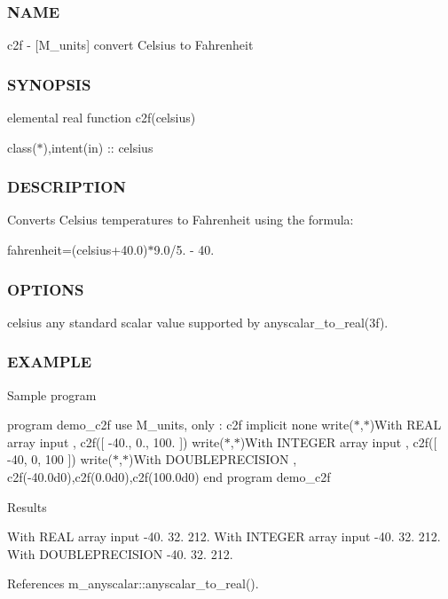 \subsubsection*{N\+A\+ME}

c2f -\/ \mbox{[}M\+\_\+units\mbox{]} convert Celsius to Fahrenheit \subsubsection*{S\+Y\+N\+O\+P\+S\+IS}

elemental real function c2f(celsius)

class($\ast$),intent(in) \+:\+: celsius \subsubsection*{D\+E\+S\+C\+R\+I\+P\+T\+I\+ON}

Converts Celsius temperatures to Fahrenheit using the formula\+:

fahrenheit=(celsius+40.0)$\ast$9.0/5. -\/ 40. \subsubsection*{O\+P\+T\+I\+O\+NS}

celsius any standard scalar value supported by anyscalar\+\_\+to\+\_\+real(3f). \subsubsection*{E\+X\+A\+M\+P\+LE}

Sample program

program demo\+\_\+c2f use M\+\_\+units, only \+: c2f implicit none write($\ast$,$\ast$)\textquotesingle{}With R\+E\+AL array input \textquotesingle{}, c2f(\mbox{[} -\/40., 0., 100. \mbox{]}) write($\ast$,$\ast$)\textquotesingle{}With I\+N\+T\+E\+G\+ER array input \textquotesingle{}, c2f(\mbox{[} -\/40, 0, 100 \mbox{]}) write($\ast$,$\ast$)\textquotesingle{}With D\+O\+U\+B\+L\+E\+P\+R\+E\+C\+I\+S\+I\+ON \textquotesingle{}, c2f(-\/40.\+0d0),c2f(0.\+0d0),c2f(100.\+0d0) end program demo\+\_\+c2f

Results

With R\+E\+AL array input -\/40. 32. 212. With I\+N\+T\+E\+G\+ER array input -\/40. 32. 212. With D\+O\+U\+B\+L\+E\+P\+R\+E\+C\+I\+S\+I\+ON -\/40. 32. 212. 

References m\+\_\+anyscalar\+::anyscalar\+\_\+to\+\_\+real().

